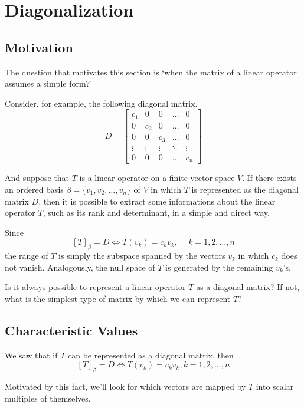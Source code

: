 \section{Diagonalization}

\subsection*{Motivation}

The question that motivates this section is `when the matrix of a linear operator assumes a simple form?'

Consider, for example, the following diagonal matrix.
\[
D = \begin{bmatrix}
c_1 & 0 & 0 & \ldots & 0 \\
0 & c_2 & 0 & \ldots & 0 \\
0 & 0 & c_3 & \ldots & 0 \\
\vdots & \vdots & \vdots & \ddots & \vdots \\
0 & 0 & 0 & \ldots & c_n
\end{bmatrix}
\]

And suppose that $T$ is a linear operator on a finite vector space $V$. If there exists an ordered basis $\beta = \{ v_1, v_2, \ldots, v_n \}$ of $V$ in which $T$ is represented as the diagonal matrix $D$, then it is possible to extract some informations about the linear operator $T$, such as its rank and determinant, in a simple and direct way.

Since 
\[
[T]_\beta = D \iff T(v_k) = c_k v_k, ~\quad k = 1, 2, \ldots, n
\]
the range of $T$ is simply the subspace spanned by the vectors $v_k$ in which $c_k$ does not vanish. Analogously, the null space  of $T$ is generated by the remaining $v_k$'s. 

Is it always possible to represent a linear operator $T$ as a diagonal matrix? If not, what is the simplest type of matrix by which we can represent $T$?

\subsection*{Characteristic Values}

We saw that if $T$ can be represented as a diagonal matrix, then
\[
	[T]_\beta = D \iff T(v_k) = c_k v_k, k = 1, 2, \ldots, n
\]

Motivated by this fact, we'll look for which vectors are mapped by $T$ into scalar multiples of themselves.

